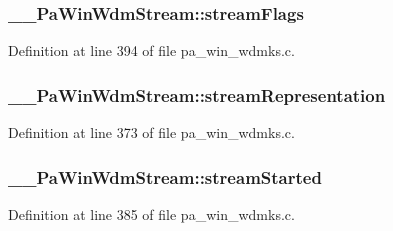 \subsubsection[{\texorpdfstring{stream\+Flags}{streamFlags}}]{ \+\_\+\+\_\+\+Pa\+Win\+Wdm\+Stream\+::stream\+Flags}\hypertarget{struct_____pa_win_wdm_stream_a515c790a2cfb6e012e152dc1713feb5c}{}\label{struct_____pa_win_wdm_stream_a515c790a2cfb6e012e152dc1713feb5c}


Definition at line 394 of file pa\+\_\+win\+\_\+wdmks.\+c.

\subsubsection[{\texorpdfstring{stream\+Representation}{streamRepresentation}}]{ \+\_\+\+\_\+\+Pa\+Win\+Wdm\+Stream\+::stream\+Representation}\hypertarget{struct_____pa_win_wdm_stream_a7e4e2c52c81ca859f290909b0e9868a6}{}\label{struct_____pa_win_wdm_stream_a7e4e2c52c81ca859f290909b0e9868a6}


Definition at line 373 of file pa\+\_\+win\+\_\+wdmks.\+c.

\subsubsection[{\texorpdfstring{stream\+Started}{streamStarted}}]{ \+\_\+\+\_\+\+Pa\+Win\+Wdm\+Stream\+::stream\+Started}\hypertarget{struct_____pa_win_wdm_stream_ab3122c31d95fb7481d45e375fa9a5a3f}{}\label{struct_____pa_win_wdm_stream_ab3122c31d95fb7481d45e375fa9a5a3f}


Definition at line 385 of file pa\+\_\+win\+\_\+wdmks.\+c.

